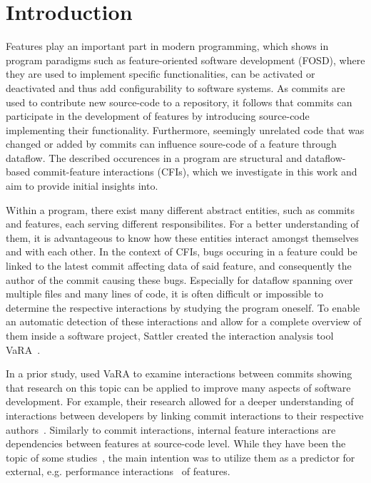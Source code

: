\chapter{Introduction}\label{ch:introduction}

Features play an important part in modern programming, which shows in program paradigms such as feature-oriented software development (FOSD), where they are used to implement specific functionalities, can be activated or deactivated and thus add configurability to software systems.
As commits are used to contribute new source-code to a repository, it follows that commits can participate in the development of features by introducing source-code implementing their functionality. 
Furthermore, seemingly unrelated code that was changed or added by commits can influence soure-code of a feature through dataflow.
The described occurences in a program are structural and dataflow-based commit-feature interactions (CFIs), which we investigate in this work and aim to provide initial insights into. 

Within a program, there exist many different abstract entities, such as commits and features, each serving different responsibilites.
For a better understanding of them, it is advantageous to know how these entities interact amongst themselves and with each other.
In the context of CFIs, bugs occuring in a feature could be linked to the latest commit affecting data of said feature, and consequently the author of the commit causing these bugs.
Especially for dataflow spanning over multiple files and many lines of code, it is often difficult or impossible to determine the respective interactions by studying the program oneself.
To enable an automatic detection of these interactions and allow for a complete overview of them inside a software project, Sattler created the interaction analysis tool VaRA~\cite{VaRA2023}.

In a prior study, \citet{sattler2023seal} used VaRA to examine interactions between commits showing that research on this topic can be applied to improve many aspects of software development.
For example, their research allowed for a deeper understanding of interactions between developers by linking commit interactions to their respective authors~\cite{sattler2023seal}. 
Similarly to commit interactions, internal feature interactions are dependencies between features at source-code level. 
While they have been the topic of some studies~\cite{kolesnikov2017relation}, the main intention was to utilize them as a predictor for external, e.g. performance interactions~\cite{siegmund2012predicting} of features.


